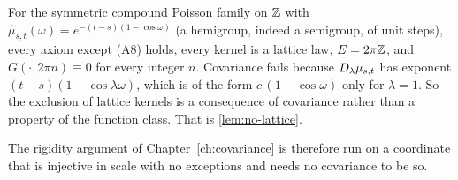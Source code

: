 \begin{remark}\label{rem:lattice-family}
For the symmetric compound Poisson family on $\mathbb{Z}$ with
$\hat\mu_{s,t}(\omega) = e^{-(t-s)(1-\cos\omega)}$ (a hemigroup, indeed a semigroup, of unit
steps), every axiom except (A8) holds, every kernel is a lattice law,
$E = 2\pi\mathbb{Z}$, and $G(\cdot,2\pi n) \equiv 0$ for every integer $n$. Covariance
fails because $D_{\lambda}\mu_{s,t}$ has exponent $(t-s)(1-\cos\lambda\omega)$, which is of
the form $c\,(1-\cos\omega)$ only for $\lambda = 1$. So the exclusion of lattice kernels is a
consequence of covariance rather than a property of the function class. That
is \ref{lem:no-lattice}.
\end{remark}

The rigidity argument of Chapter~\ref{ch:covariance} is therefore run on a coordinate that is
injective in scale with no exceptions and needs no covariance to be so.

